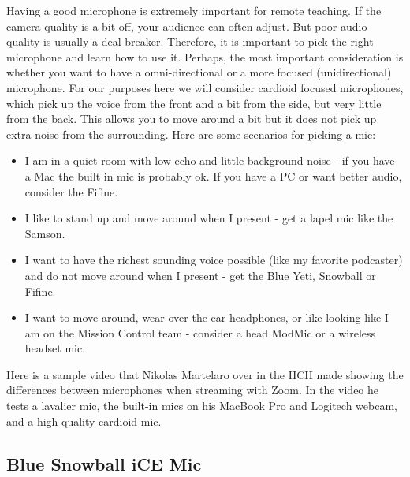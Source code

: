 \begin{gram}
\label{grm:equipment::mics::how}
Having a good microphone is extremely important for remote teaching. 
%
If the camera quality is a bit off, your audience  can often adjust.
%
But poor audio quality is usually a deal breaker.
%
Therefore, it is important to pick the right microphone and learn how to use it. 
%
Perhaps, the most important consideration is whether you want to have a
omni-directional or a more focused (unidirectional) microphone.
%
For our purposes here we will consider cardioid focused
microphones, which pick up the voice from the front and a bit from the
side, but very little from the back.  This allows you to move around a
bit but it does not pick up extra noise from the surrounding.
%
Here are some scenarios for picking a mic:

\begin{itemize}
	\item I am in a quiet room with low echo and little background noise - if you have a Mac the built in mic is probably ok. If you have a PC or want better audio, consider the Fifine.
	\item I like to stand up and move around when I present - get a lapel mic like the Samson.
	\item I want to have the richest sounding voice possible (like my favorite podcaster) and do not move around when I present - get the Blue Yeti, Snowball or Fifine.
	\item I want to move around, wear over the ear headphones, or like looking like I am on the Mission Control team - consider a head ModMic or a wireless headset mic.
\end{itemize}
\end{gram}

\begin{gram}
\label{grm:equipment::mics::comparison}
Here is a sample video that Nikolas Martelaro over in the HCII made showing the differences between microphones when streaming with Zoom. In the video he tests a lavalier mic, the built-in mics on his MacBook Pro and Logitech webcam, and a high-quality cardioid mic.

\end{gram}

\subsection{Blue Snowball iCE Mic}
\label{sec:equipment::bluesnow}

